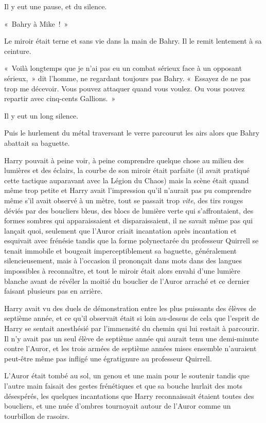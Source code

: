 Il y eut une pause, et du silence.

«~Bahry à Mike~!~»

Le miroir était terne et sans vie dans la main de Bahry. Il le remit lentement à sa ceinture.

«~Voilà longtemps que je n'ai pas eu un combat sérieux face à un opposant sérieux,~» dit l'homme, ne regardant toujours pas Bahry. «~Essayez de ne pas trop me décevoir. Vous pouvez attaquer quand vous voulez. Ou vous pouvez repartir avec cinq-cents Gallions.~»

Il y eut un long silence.

Puis le hurlement du métal traversant le verre parcourut les airs alors que Bahry abattait sa baguette.

\later

Harry pouvait à peine voir, à peine comprendre quelque chose au milieu des lumières et des éclairs, la courbe de son miroir était parfaite (il avait pratiqué cette tactique auparavant avec la Légion du Chaos) mais la scène était quand même trop petite et Harry avait l'impression qu'il n'aurait pas pu comprendre même s'il avait observé à un mètre, tout se passait trop \emph{vite}, des tirs rouges déviés par des boucliers bleus, des blocs de lumière verte qui s'affrontaient, des formes sombres qui apparaissaient et disparaissaient, il ne savait même pas qui lançait quoi, seulement que l'Auror criait incantation après incantation et esquivait avec frénésie tandis que la forme polynectarée du professeur Quirrell se tenait immobile et bougeait imperceptiblement sa baguette, généralement silencieusement, mais à l'occasion il prononçait dans mots dans des langues impossibles à reconnaître, et tout le miroir était alors envahi d'une lumière blanche avant de révéler la moitié du bouclier de l'Auror arraché et ce dernier faisant plusieurs pas en arrière.

Harry avait vu des duels de démonstration entre les plus puissants des élèves de septième année, et ce qu'il observait était si loin au-dessus de cela que l'esprit de Harry se sentait anesthésié par l'immensité du chemin qui lui restait à parcourir. Il n'y avait pas un seul élève de septième année qui aurait tenu une demi-minute contre l'Auror, et les trois armées de septième années mises ensemble n'auraient peut-être même pas infligé une égratignure au professeur Quirrell.

L'Auror était tombé au sol, un genou et une main pour le soutenir tandis que l'autre main faisait des gestes frénétiques et que sa bouche hurlait des mots désespérés, les quelques incantations que Harry reconnaissait étaient toutes des boucliers, et une nuée d'ombres tournoyait autour de l'Auror comme un tourbillon de rasoirs.

